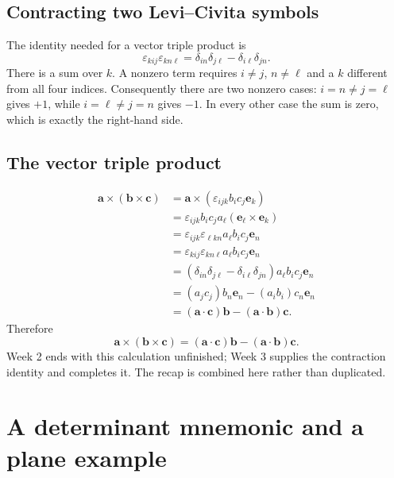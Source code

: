 \subsection{Contracting two Levi--Civita symbols}
The identity needed for a vector triple product is
\[
 \boxed{\varepsilon_{kij}\varepsilon_{kn\ell}
 =\delta_{in}\delta_{j\ell}-\delta_{i\ell}\delta_{jn}}.
\]
There is a sum over $k$. A nonzero term requires $i\ne j$, $n\ne\ell$
and a $k$ different from all four indices. Consequently there are two
nonzero cases: $i=n\ne j=\ell$ gives $+1$, while
$i=\ell\ne j=n$ gives $-1$. In every other case the sum is zero,
which is exactly the right-hand side.

\subsection{The vector triple product}
\begin{align*}
 \mathbf a\times(\mathbf b\times\mathbf c)
 &=\mathbf a\times(\varepsilon_{ijk}b_i c_j\mathbf e_k)\\
 &=\varepsilon_{ijk}b_i c_j a_\ell
       (\mathbf e_\ell\times\mathbf e_k)\\
 &=\varepsilon_{ijk}\varepsilon_{\ell kn}a_\ell b_i c_j\mathbf e_n\\
 &=\varepsilon_{kij}\varepsilon_{kn\ell}a_\ell b_i c_j\mathbf e_n\\
 &=(\delta_{in}\delta_{j\ell}-\delta_{i\ell}\delta_{jn})
       a_\ell b_i c_j\mathbf e_n\\
 &=(a_jc_j)b_n\mathbf e_n-(a_i b_i)c_n\mathbf e_n\\
 &=(\mathbf a\cdot\mathbf c)\mathbf b-(\mathbf a\cdot\mathbf b)\mathbf c.
\end{align*}
Therefore
\[
 \boxed{\mathbf a\times(\mathbf b\times\mathbf c)
 =(\mathbf a\cdot\mathbf c)\mathbf b-(\mathbf a\cdot\mathbf b)\mathbf c}.
\]
Week 2 ends with this calculation unfinished; Week 3 supplies the contraction
identity and completes it. The recap is combined here rather than duplicated.

\section{A determinant mnemonic and a plane example}

